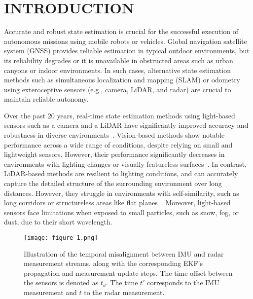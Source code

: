 \section{INTRODUCTION}
\label{sec: introduction}
Accurate and robust state estimation is crucial for the successful execution of autonomous missions using mobile robots or vehicles. Global navigation satellite system (GNSS) provides reliable estimation in typical outdoor environments, but its reliability degrades or it is unavailable in obstructed areas such as urban canyons or indoor environments. In such cases, alternative state estimation methods such as simultaneous localization and mapping (SLAM) or odometry using exteroceptive sensors (e.g., camera, LiDAR, and radar) are crucial to maintain reliable autonomy.

Over the past 20 years, real-time state estimation methods using light-based sensors such as a camera and a LiDAR have significantly improved accuracy and robustness in diverse environments~\cite{9196524, 9440682, 9341176, 9697912}. Vision-based methods show notable performance across a wide range of conditions, despite relying on small and lightweight sensors. However, their performance significantly decreases in environments with lighting changes or visually featureless surfaces~\cite{zhang2018laser}. In contrast, LiDAR-based methods are resilient to lighting conditions, and can accurately capture the detailed structure of the surrounding environment over long distances. However, they struggle in environments with self-similarity, such as long corridors or structureless areas like flat planes~\cite{10611444}. Moreover, light-based sensors face limitations when exposed to small particles, such as snow, fog, or dust, due to their short wavelength.

\begin{figure}[t]
\centering \texttt{[image: figure\_1.png]} \caption{Illustration of the temporal misalignment between IMU and radar measurement streams, along with the corresponding EKF's propagation and measurement update steps. The time offset between the sensors is denoted as $t_d$. The time $t'$ corresponds to the IMU measurement and $t$ to the radar measurement.} \label{fig1}
\end{figure}

